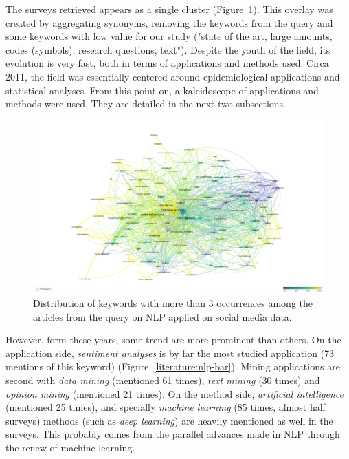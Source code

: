 The surveys retrieved appears as a single cluster (Figure~\ref{literature:nlp-overlay}).
This overlay was created by aggregating synonyms, removing the keywords from the query and some keywords with low value for our study ("state of the art, large amounts, codes (symbols), research questions, text").
Despite the youth of the field, its evolution is very fast, both in terms of applications and methods used.
Circa 2011, the field was essentially centered around epidemiological applications and statistical analyses.
From this point on, a kaleidoscope of applications and methods were used.
They are detailed in the next two subsections.

\begin{landscape}
    \begin{figure}[htb]
        \includegraphics[width=\paperwidth,height=\paperheight,keepaspectratio]{figures/chap-2/nlp-overlay.pdf}
        \caption{Distribution of keywords with more than 3 occurrences among the articles from the query on NLP applied on social media data.}
        \label{literature:nlp-overlay}
    \end{figure}
\end{landscape}

However, form these years, some trend are more prominent than others.
On the application side, \emph{sentiment analyses} is by far the most studied application (73 mentions of this keyword) (Figure~\ref{literature:nlp-bar}).
Mining applications are second with \emph{data mining} (mentioned 61 times), \emph{text mining} (30 times) and \emph{opinion mining} (mentioned 21 times).
On the method side, \emph{artificial intelligence} (mentioned 25 times), and specially \emph{machine learning} (85 times, almost half surveys) methods (such as \emph{deep learning}) are heavily mentioned as well in the surveys.
This probably comes from the parallel advances made in NLP through the renew of machine learning.

